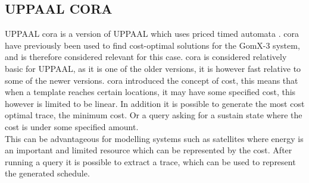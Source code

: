 \subsection{UPPAAL CORA}
UPPAAL \gls{cora} is a version of UPPAAL which uses priced timed automata \cite{cs_cora}. \Gls{cora} have previously been used to find cost-optimal solutions for the GomX-3 system\cite{gomx3}, and is therefore considered relevant for this case.
\Gls{cora} is considered relatively basic for UPPAAL, as it is one of the older versions, it is however fast relative to some of the newer versions. \Gls{cora} introduced the concept of cost, this means that when a template reaches certain locations, it may have some specified cost, this however is limited to be linear. In addition it is possible to generate the most cost optimal trace, the minimum cost. Or a query asking for a sustain state where the cost is under some specified amount.\\
This can be advantageous for modelling systems such as satellites where energy is an important and limited resource which can be represented by the cost. After running a query it is possible to extract a trace, which can be used to represent the generated schedule.